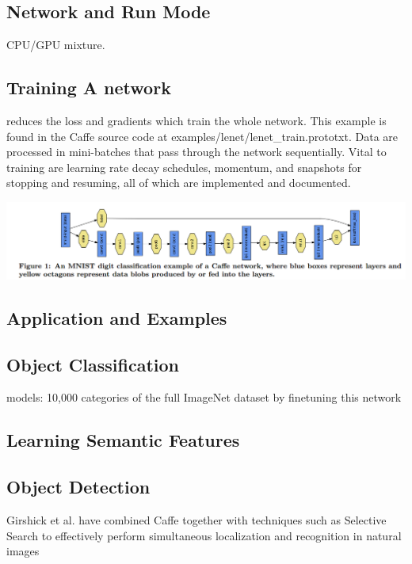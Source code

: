 \documentclass{article}
\begin{document}
\subsection{Network and Run Mode}

CPU/GPU mixture.

\subsection{Training A network}

reduces the loss and gradients which train the whole network. This example is found in the Caffe source code at examples\//lenet\//lenet\_train.prototxt. Data are processed in mini-batches that pass through the network sequentially. Vital to training are learning rate decay schedules, momentum, and snapshots for stopping and resuming, all of which are implemented and documented.

\begin{center}
\includegraphics[scale=0.25]{Caffe_Note_2.png}
\end{center}



\subsection{Application and Examples}
\subsection{Object Classification}
models: 10,000 categories of the full ImageNet dataset by finetuning
this network

\subsection{Learning Semantic Features}





\subsection{Object Detection}
Girshick et al. have combined Caffe together with techniques
such as Selective Search to effectively perform
simultaneous localization and recognition in natural images
\end{document}
